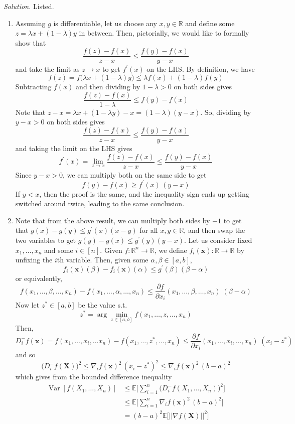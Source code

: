 \documentclass{article}
\DeclareMathOperator{\Var}{Var}
\theoremstyle{definition}
\theoremstyle{remark}
\theoremstyle{definition}
\newenvironment{solution}{\noindent \textit{Solution.}}{}
\begin{document}
\begin{solution}
Listed. 
\begin{enumerate}
    \item Assuming $g$ is differentiable, let us choose any $x, y \in \mathbb{R}$ and define some $z = \lambda x + (1 - \lambda)y$ in between. Then, pictorially, we would like to formally show that 
    \[\frac{f(z) - f(x)}{z - x} \leq \frac{f(y) - f(x)}{y - x}\]
    and take the limit as $z \rightarrow x$ to get $f^\prime(x)$ on the LHS. By definition, we have 
    \[f(z) = f\big( \lambda x + (1 - \lambda) y\big) \leq \lambda f(x) + (1 - \lambda) f(y)\]
    Subtracting $f(x)$ and then dividing by $1 - \lambda > 0$ on both sides gives 
    \[\frac{f(z) - f(x)}{1 - \lambda} \leq f(y) - f(x)\] 
    Note that $z - x = \lambda x + (1 - \lambda y) - x = (1 - \lambda)(y - x)$. So, dividing by $y - x > 0$ on both sides gives 
    \[\frac{f(z) - f(x)}{z - x} \leq \frac{f(y) - f(x)}{y - x}\]
    and taking the limit on the LHS gives 
    \[f^\prime (x) = \lim_{z \rightarrow x} \frac{f(z) - f(x)}{z - x} \leq \frac{f(y) - f(x)}{y - x}\]
    Since $y - x > 0$, we can multiply both on the same side to get 
    \[f(y) - f(x) \geq f^\prime (x) \, (y - x)\]
    If $y < x$, then the proof is the same, and the inequality sign ends up getting switched around twice, leading to the same conclusion. 
    
    \item Note that from the above result, we can multiply both sides by $-1$ to get that $g(x) - g(y) \leq g^\prime (x) (x - y)$ for all $x, y \in \mathbb{R}$, and then swap the two variables to get $g(y) - g(x) \leq g^\prime (y) (y - x)$. Let us consider fixed $x_1, \ldots, x_n$ and some $i \in [n]$. Given $f: \mathbb{R}^n \rightarrow \mathbb{R}$, we define $f_i (\mathbf{x}): \mathbb{R} \rightarrow \mathbb{R}$ by unfixing the $i$th variable. Then, given some $\alpha, \beta \in [a, b]$, 
    \[f_i (\mathbf{x}) (\beta) - f_i (\mathbf{x}) (\alpha) \leq g^\prime (\beta) (\beta - \alpha)\]
    or equivalently, 
    \[f(x_1, \ldots, \beta, \ldots, x_n) - f(x_1, \ldots, \alpha, \ldots, x_n) \leq \frac{\partial f}{\partial x_i} (x_1, \ldots, \beta, \ldots, x_n) \; (\beta - \alpha)\]
    Now let $z^\ast \in [a, b]$ be the value s.t. 
    \[z^\ast = \arg \min_{z \in [a, b]} f(x_1, \ldots, z, \ldots, x_n) \]
    Then, 
    \[D_i^- f(\mathbf{x}) = f(x_1, \ldots, x_i, \ldots x_n) - f(x_1, \ldots, z^\ast, \ldots, x_n) \leq \frac{\partial f}{\partial x_i} (x_1, \ldots, x_i, \ldots, x_n) \; (x_i - z^\ast)\]
    and so 
    \[\big( D_i^- f(\mathbf{X}) \big)^2 \leq \nabla_i f (\mathbf{x})^2 \, (x_i - z^\ast)^2 \leq \nabla_i f (\mathbf{x})^2 \, (b - a)^2\]
    which gives from the bounded difference inequality 
    \begin{align*}
        \Var[f(X_1, \ldots, X_n)] & \leq \mathbb{E} \bigg[ \sum_{i=1}^n \big( D_i^- f(X_1, \ldots, X_n) \big)^2 \bigg] \\
        & \leq \mathbb{E} \bigg[ \sum_{i=1}^n \nabla_i f (\mathbf{x})^2 \, (b - a)^2 \bigg] \\
        & = (b - a)^2 \mathbb{E} \big[ \big| \big| \nabla f(\mathbf{X})\big| \big|^2 \big]
    \end{align*}
    

\end{enumerate}
\end{solution}
\end{document}
